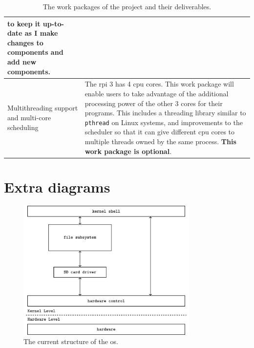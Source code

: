 \documentclass{article}
\begin{document}
\begin{table}[H]
\begin{center}
\begin{tabular}{|p{40mm}|p{115mm}|}
    to keep it up-to-date as I make changes to components and add new
    components.
    \\ \hline
    Multithreading support and multi-core scheduling &
    The \gls{rpi} 3 has 4 \gls{cpu} cores. This work package will enable users
    to take advantage of the additional processing power of the other 3 cores
    for their programs. This includes a threading library similar to
    \texttt{pthread} on Linux systems, and improvements to the scheduler so
    that it can give different \gls{cpu} cores to multiple threads owned by the
    same process. \textbf{This work package is optional}.
    \\ \hline
\end{tabular}
\caption{The work packages of the project and their deliverables.}
\label{tab:original-work-packages}
\end{center}
\end{table}

\section{Extra diagrams}

\begin{figure}[H]
    \centering
    \includegraphics[width=0.8\textwidth]{build/finished-block-diagram.pdf}
    \caption{The current structure of the \gls{os}.}
    \label{fig:appendix_finished_block_diagram}
\end{figure}
\end{document}

